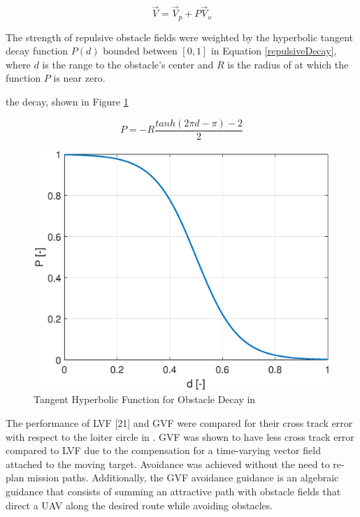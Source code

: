 \documentclass[numbered,pdftex]{ohio-etd}
\begin{document}
 
 \begin{equation}
 \overrightarrow{V} = \overrightarrow{V}_{p}+P\overrightarrow{V}_{o}
 \label{summedAttRepulsive}
 \end{equation}
 
 \noindent
 The strength of repulsive obstacle fields were weighted by the hyperbolic tangent decay function $P(d)$ bounded between $[0,1]$ in Equation \ref{repulsiveDecay}, where $d$ is the range to the obstacle's center and $R$ is the radius of at which the function $P$ is near zero. 
 
 the decay, shown in Figure \ref{fig:tanhLit}
 
 \begin{equation}
 P = -R\frac{tanh(2\pi d-\pi)-2}{2}
 \label{repulsiveDecay}
 \end{equation}

\begin{figure}[H]
	\centering
	\includegraphics[width=12cm]{PaperFigures/Literature/tanh}
	\caption{Tangent Hyperbolic Function for Obstacle Decay in \cite{wilhelm_2019}}
	\label{fig:tanhLit}
\end{figure}

 
 \noindent
 The performance of LVF [21] and GVF \cite{goncalves_artificial_2009,goncalves_circulation_2010,goncalves_vector_2010} were compared for their cross track error with respect to the loiter circle in \cite{wilhelm_2019}. GVF was shown to have less cross track error compared to LVF due to the compensation for a time-varying vector field attached to the moving target. Avoidance was achieved without the need to re-plan mission paths. Additionally, the GVF avoidance guidance is an algebraic guidance that consists of summing an attractive path with obstacle fields that direct a UAV along the desired route while avoiding obstacles. \\
\end{document}
